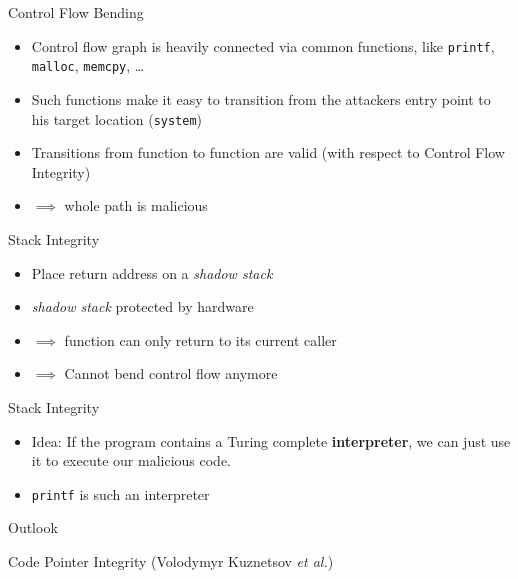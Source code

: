 \documentclass[beamer]{uibk}
\begin{document}
\begin{frame}{Control Flow Bending}
    \begin{itemize}
        \item Control flow graph is heavily connected via common functions,
                like \texttt{printf}, \texttt{malloc}, \texttt{memcpy}, \dots
        \medskip
        \item Such functions make it easy to transition from the attackers
            entry point to his target location (\texttt{system})
        \medskip
        \item Transitions from function to function are valid (with respect to
            Control Flow Integrity)
        \medskip
        \item $\implies$ whole path is malicious
    \end{itemize}
\end{frame}

\begin{frame}{Stack Integrity}
    \begin{itemize}
        \item Place return address on a \textit{shadow stack}
        \medskip
        \item \textit{shadow stack} protected by hardware
        \medskip
        \item $\implies$ function can only return to its current caller
        \medskip
        \item $\implies$ Cannot bend control flow anymore
    \end{itemize}
\end{frame}

\begin{frame}{Stack Integrity}
    \begin{itemize}
        \item Idea: If the program contains a Turing complete
            \textbf{interpreter}, we can just use it to execute our malicious
            code.
        \bigskip
        \pause
        \item \texttt{printf} is such an interpreter
    \end{itemize}
\end{frame}

\begin{frame}{Outlook}
    \begin{center}
        Code Pointer Integrity (Volodymyr Kuznetsov \textit{et al.})
    \end{center}
\end{frame}
\end{document}
